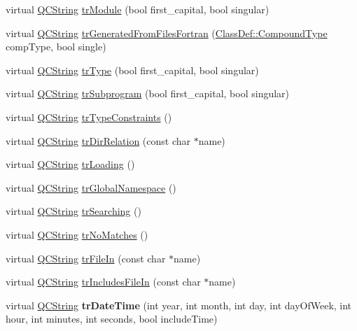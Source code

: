\begin{DoxyCompactItemize}
virtual \hyperlink{class_q_c_string}{Q\-C\-String} \hyperlink{class_translator_dutch_a894e0b632e1680e918c78fea5b9b5384}{tr\-Module} (bool first\-\_\-capital, bool singular)
\item 
virtual \hyperlink{class_q_c_string}{Q\-C\-String} \hyperlink{class_translator_dutch_ab89226b80b72b0ff8f4fca99626097ba}{tr\-Generated\-From\-Files\-Fortran} (\hyperlink{class_class_def_a768a6f0a6fd7e9087ff7971abbcc3f36}{Class\-Def\-::\-Compound\-Type} comp\-Type, bool single)
\item 
virtual \hyperlink{class_q_c_string}{Q\-C\-String} \hyperlink{class_translator_dutch_a2763a6af55d1ca03be54604c2bc4a3b4}{tr\-Type} (bool first\-\_\-capital, bool singular)
\item 
virtual \hyperlink{class_q_c_string}{Q\-C\-String} \hyperlink{class_translator_dutch_aeceda8d8c2b8645fd2337cb38d293269}{tr\-Subprogram} (bool first\-\_\-capital, bool singular)
\item 
virtual \hyperlink{class_q_c_string}{Q\-C\-String} \hyperlink{class_translator_dutch_a196f3eb690f2748ee71f518cf02bd7fe}{tr\-Type\-Constraints} ()
\item 
virtual \hyperlink{class_q_c_string}{Q\-C\-String} \hyperlink{class_translator_dutch_a38a56cc8bcc5323be9d1f09b0daa5933}{tr\-Dir\-Relation} (const char $\ast$name)
\item 
virtual \hyperlink{class_q_c_string}{Q\-C\-String} \hyperlink{class_translator_dutch_aca8cf7409bceb9f8e6af47f637da5457}{tr\-Loading} ()
\item 
virtual \hyperlink{class_q_c_string}{Q\-C\-String} \hyperlink{class_translator_dutch_aa9fd39641e570165be20c71c67481fee}{tr\-Global\-Namespace} ()
\item 
virtual \hyperlink{class_q_c_string}{Q\-C\-String} \hyperlink{class_translator_dutch_aea79f5912e787bbb2c441223ccd382c6}{tr\-Searching} ()
\item 
virtual \hyperlink{class_q_c_string}{Q\-C\-String} \hyperlink{class_translator_dutch_a240e49b617153456e0f29bef561cc10f}{tr\-No\-Matches} ()
\item 
virtual \hyperlink{class_q_c_string}{Q\-C\-String} \hyperlink{class_translator_dutch_acf964d17bad4c55c393193fe9708575f}{tr\-File\-In} (const char $\ast$name)
\item 
virtual \hyperlink{class_q_c_string}{Q\-C\-String} \hyperlink{class_translator_dutch_a53f57c6e2aa0b9dc09bc47b3746d3481}{tr\-Includes\-File\-In} (const char $\ast$name)
\item 
\hypertarget{class_translator_dutch_a19c43671f677ae0445fca1fe7a5f62cc}{virtual \hyperlink{class_q_c_string}{Q\-C\-String} {\bfseries tr\-Date\-Time} (int year, int month, int day, int day\-Of\-Week, int hour, int minutes, int seconds, bool include\-Time)}\label{class_translator_dutch_a19c43671f677ae0445fca1fe7a5f62cc}


\end{DoxyCompactItemize}

